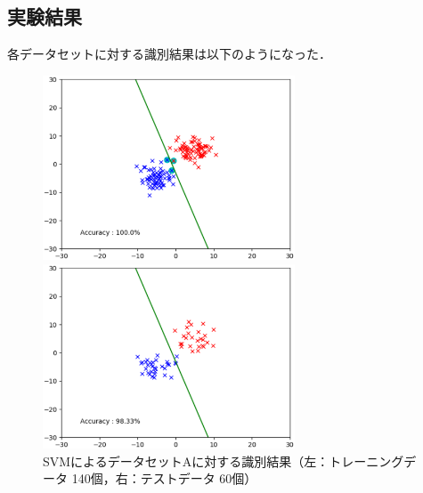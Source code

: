 \subsection*{実験結果}
各データセットに対する識別結果は以下のようになった．
\begin{figure}[H]
    \begin{minipage}{0.5\hsize}
        \begin{center}
            \includegraphics[width=75mm]{./figures/task1/Figure_200_train.eps}
        \end{center}
    \end{minipage}
    \begin{minipage}{0.5\hsize}
        \begin{center}
            \includegraphics[width=75mm]{./figures/task1/Figure_200_test.eps}
        \end{center}
    \end{minipage}
    \caption{SVMによるデータセットAに対する識別結果（左：トレーニングデータ 140個，右：テストデータ 60個）}
    \label{graph1}
\end{figure}
